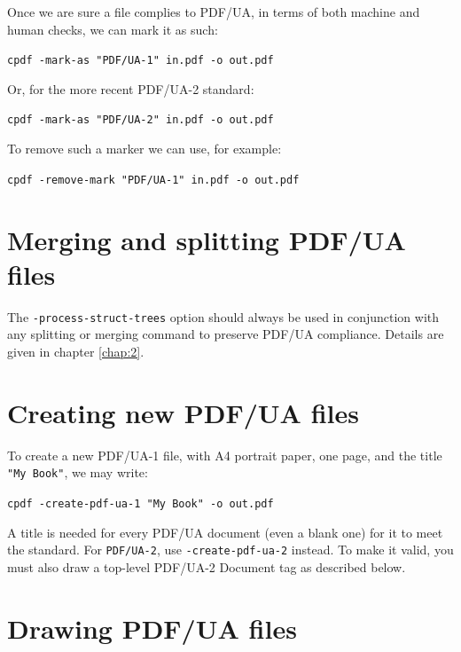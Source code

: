 \documentclass{book}
\begin{document}
Once we are sure a file complies to PDF/UA, in terms of both machine and human checks, we can mark it as such:

  \begin{framed}
    \noindent\small\verb!cpdf -mark-as "PDF/UA-1" in.pdf -o out.pdf!
  \end{framed}

\noindent Or, for the more recent PDF/UA-2 standard:

  \begin{framed}
    \noindent\small\verb!cpdf -mark-as "PDF/UA-2" in.pdf -o out.pdf!
  \end{framed}

\noindent To remove such a marker we can use, for example:

  \begin{framed}
    \noindent\small\verb!cpdf -remove-mark "PDF/UA-1" in.pdf -o out.pdf!
  \end{framed}

\section{Merging and splitting PDF/UA files}

\noindent The \texttt{-process-struct-trees} option should always be used in conjunction with any splitting or merging command to preserve PDF/UA compliance. Details are given in chapter \ref{chap:2}.

\section{Creating new PDF/UA files}

To create a new PDF/UA-1 file, with A4 portrait paper, one page, and the title \texttt{"My Book"}, we may write:

  \begin{framed}
    \noindent\small\verb!cpdf -create-pdf-ua-1 "My Book" -o out.pdf!
  \end{framed}

\noindent A title is needed for every PDF/UA document (even a blank one) for it to meet the standard. For \texttt{PDF/UA-2}, use \texttt{-create-pdf-ua-2} instead. To make it valid, you must also draw a top-level PDF/UA-2 Document tag as described below.

\section{Drawing PDF/UA files}
\end{document}
